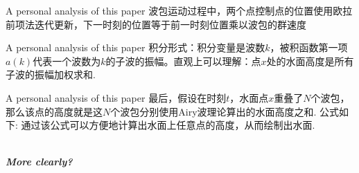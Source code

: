 \documentclass{beamer}
\begin{document}
\begin{frame}{A personal analysis of this paper}
  波包运动过程中，两个点控制点的位置使用欧拉前项法迭代更新，下一时刻的位置等于前一时刻位置乘以波包的群速度
  \begin{figure}[thpb]
    \centering
  \label{fig:system}
  \end{figure}
\end{frame}
\begin{frame}{A personal analysis of this paper}
  积分形式：积分变量是波数$k$，被积函数第一项$a(k)$代表一个波数为$k$的子波的振幅。直观上可以理解：\textcolor[rgb]{0,0,1}{点$x$处的水面高度是所有子波的振幅加权求和}.
  \begin{figure}[thpb]
    \centering
  \label{fig:system}
  \end{figure}
\end{frame}
\begin{frame}{A personal analysis of this paper}
  最后，假设在时刻$t$，水面点$x$重叠了$N$个波包，那么该点的高度就是这$N$个波包分别使用Airy波理论算出的水面高度之和. 公式如下: 通过该公式可以方便地计算出水面上任意点的高度，从而绘制出水面.
  \begin{figure}[thpb]
    \centering
  \label{fig:system}
  \end{figure}
  \\ \emph{\large \centering \textbf{\textcolor[rgb]{0,0,1}{More clearly?}}}
\end{frame}
\end{document}

